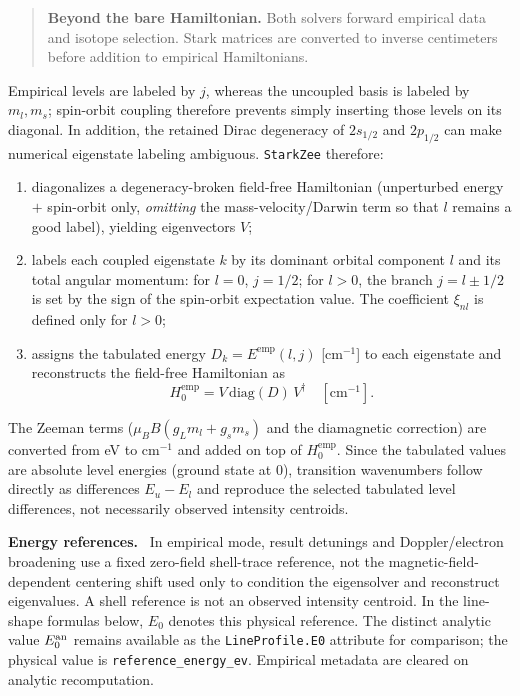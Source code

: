 \documentclass[11pt,a4paper]{article}
\newenvironment{implnote}[1][Implementation]{%
  \par\smallskip\noindent\begin{lrbox}{\notebox}\setlength{\fboxsep}{6pt}\begin{minipage}{\dimexpr\linewidth-2\fboxsep-2\fboxrule\relax}\small\textbf{#1.}\ }{%
  \end{minipage}\end{lrbox}\setlength{\fboxsep}{6pt}\fcolorbox{noteframe}{notebg}{\usebox{\notebox}}\par\smallskip}
\numberwithin{equation}{section}
\begin{document}
\begin{quote}
\textbf{Beyond the bare Hamiltonian.} Both solvers forward empirical data and isotope selection. Stark matrices are converted to inverse centimeters before addition to empirical Hamiltonians.
\end{quote}

Empirical levels are labeled by $j$, whereas the uncoupled basis is labeled
by $m_l,m_s$; spin-orbit coupling therefore prevents simply inserting those
levels on its diagonal. In addition, the retained Dirac degeneracy of
$2s_{1/2}$ and $2p_{1/2}$ can make numerical eigenstate labeling ambiguous.
\texttt{StarkZee} therefore:
\begin{enumerate}
    \item diagonalizes a degeneracy-broken field-free Hamiltonian (unperturbed energy
    $+$ spin-orbit only, \emph{omitting} the mass-velocity/Darwin term so that $l$
    remains a good label), yielding eigenvectors $V$;
    \item labels each coupled eigenstate $k$ by its dominant orbital component $l$ and
    its total angular momentum: for $l=0$, $j=1/2$; for $l>0$, the branch $j=l\pm1/2$ is set by the sign of the spin-orbit expectation value. The coefficient $\xi_{nl}$ is defined only for $l>0$;
    \item assigns the tabulated energy $D_k = E^{\mathrm{emp}}(l, j)$ [cm$^{-1}$] to each eigenstate
    and reconstructs the field-free Hamiltonian as
    \begin{equation}
    H_0^{\mathrm{emp}} = V\,\mathrm{diag}(D)\,V^\dagger \quad [\mathrm{cm}^{-1}].
    \end{equation}
\end{enumerate}
The Zeeman terms ($\mu_B B (g_L m_l + g_s m_s)$ and the diamagnetic correction) are
converted from eV to cm$^{-1}$ and added on top of $H_0^{\mathrm{emp}}$.
Since the tabulated values are absolute level energies (ground state at $0$),
transition wavenumbers follow directly as differences $E_u - E_l$ and reproduce the selected tabulated level differences, not necessarily observed intensity centroids.

\begin{implnote}[Energy references]
In empirical mode, result detunings and Doppler/electron broadening use a fixed
zero-field shell-trace reference, not the magnetic-field-dependent centering shift
used only to condition the eigensolver and reconstruct eigenvalues. A shell
reference is not an observed intensity centroid. In the line-shape formulas
below, $E_0$ denotes this physical reference. The distinct analytic value
$E_0^{\rm an}$ remains available as the \texttt{LineProfile.E0} attribute for
comparison; the physical value is \texttt{reference\_energy\_ev}. Empirical
metadata are cleared on analytic recomputation.
\end{implnote}
\end{document}
